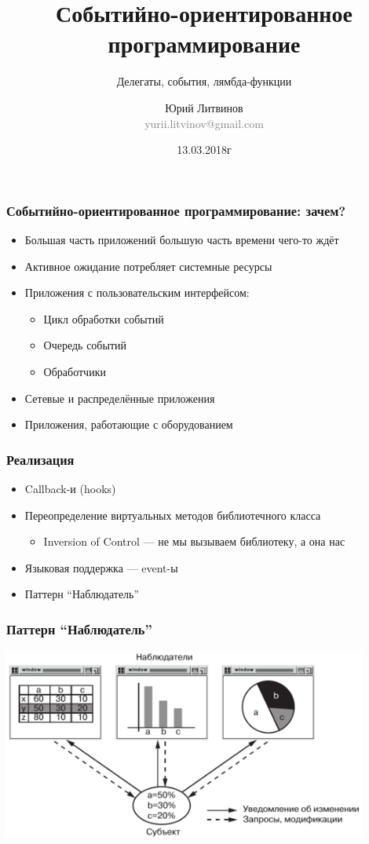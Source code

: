 \documentclass[xetex,mathserif,serif]{beamer}
\title{Событийно-ориентированное программирование}
\subtitle{Делегаты, события, лямбда-функции}
\author[Юрий Литвинов]{Юрий Литвинов\\\small{\textcolor{gray}{yurii.litvinov@gmail.com}}}
\date{13.03.2018г}
\begin{document}
	\frame{\titlepage}

		\begin{frame}
		\frametitle{Событийно-ориентированное программирование: зачем?}
		\begin{itemize}
			\item Большая часть приложений большую часть времени чего-то ждёт
			\item Активное ожидание потребляет системные ресурсы
			\item Приложения с пользовательским интерфейсом:
			\begin{itemize}
				\item Цикл обработки событий
				\item Очередь событий
				\item Обработчики
			\end{itemize}
			\item Сетевые и распределённые приложения
			\item Приложения, работающие с оборудованием
		\end{itemize}
	\end{frame}

	\begin{frame}
		\frametitle{Реализация}
		\begin{itemize}
			\item Callback-и (hooks)
			\item Переопределение виртуальных методов библиотечного класса
			\begin{itemize}
				\item Inversion of Control --- не мы вызываем библиотеку, а она нас
			\end{itemize}
			\item Языковая поддержка --- event-ы
			\item Паттерн ``Наблюдатель''
		\end{itemize}
	\end{frame}

	\begin{frame}
		\frametitle{Паттерн ``Наблюдатель''}
		\begin{center}
			\includegraphics[width=0.9\textwidth]{observerExample.png}
		\end{center}
	\end{frame}
\end{document}
